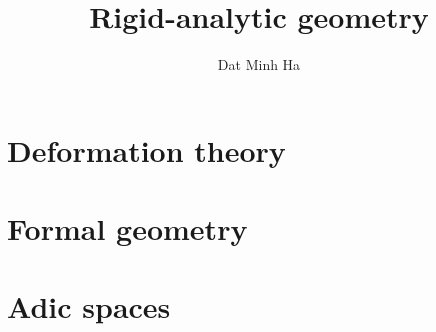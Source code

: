 

\setcounter{chapter}{-1}




	\title{Rigid-analytic geometry}
	
	\author{Dat Minh Ha}
	\maketitle
	
	\begin{abstract}
	    
	\end{abstract}
	
	{
      \hypersetup{} 
      \tableofcontents %
    }
    
    
    
    \chapter{Deformation theory}
        \begin{abstract}
            
        \end{abstract}
        
        \minitoc
    
        
        
        
        
        
    
    \chapter{Formal geometry}
        \begin{abstract}
            
        \end{abstract}
        
        \minitoc
        
        
        
        
        
        
    
    \chapter{Adic spaces}
        \begin{abstract}
            
        \end{abstract}
        
        \minitoc
        
        
	
	\printbibliography

